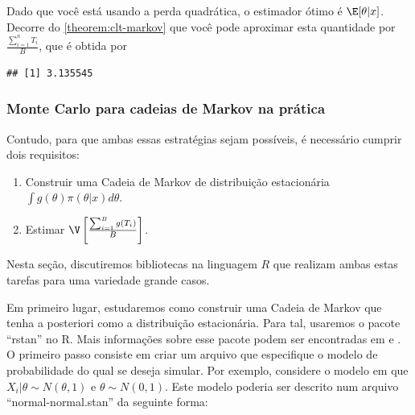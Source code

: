 \begin{example}
\begin{knitrout}
\begin{kframe}
\begin{alltt}
\end{alltt}
\end{kframe}
\end{knitrout}
Dado que você está usando a perda quadrática,
o estimador ótimo é $\E[\theta|x]$.
Decorre do \cref{theorem:clt-markov} que
você pode aproximar esta quantidade por
$\frac{\sum_{i=1}^{n}{T_{i}}}{B}$, que é
obtida por
\begin{knitrout}
\color{fgcolor}\begin{kframe}
\begin{alltt}
\hlstd{(}\hlstd{(}\hlstd{(}\hlopt{^}\hlstd{,}
\end{alltt}
\begin{verbatim}
## [1] 3.135545
\end{verbatim}
\end{kframe}
\end{knitrout}
\end{example}

\subsubsection{Monte Carlo para cadeias de Markov na prática}

Contudo, para que ambas essas estratégias sejam possíveis,
é necessário cumprir dois requisitos:
\begin{enumerate}
 \item Construir uma Cadeia de Markov de distribuição estacionária $\int{g(\theta)\pi(\theta|x)d\theta}$.
 \item Estimar $\V\left[\frac{\sum_{i=1}^{B}{g(T_{i})}}{B}\right]$.
\end{enumerate}
Nesta seção, discutiremos bibliotecas
na linguagem $R$ que realizam ambas estas tarefas
para uma variedade grande casos.

Em primeiro lugar, 
estudaremos como construir uma Cadeia de Markov
que tenha a posteriori como a distribuição estacionária.
Para tal, usaremos o pacote ``rstan'' no R.
Mais informações sobre esse pacote 
podem ser encontradas em \citet{Gelman2014} e \citet{Stan2015}.
O primeiro passo consiste em criar um arquivo
que especifique o modelo de probabilidade do qual se deseja simular.
Por exemplo, considere o modelo em que $X_{i}|\theta \sim N(\theta,1)$
e $\theta \sim N(0,1)$. 
Este modelo poderia ser descrito num arquivo ``normal-normal.stan'' da seguinte forma:


